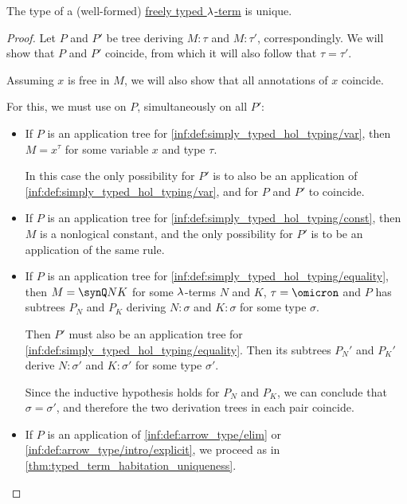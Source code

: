 \begin{proposition}\label{thm:simply_typed_hol_type_uniqueness}
  The type of a (well-formed) \hyperref[def:freely_typed_lambda_term]{freely typed \( {\mathrm \lambda} \)-term} is unique.
\end{proposition}
\begin{proof}
  Let \( P \) and \( P' \) be tree deriving \( M: \tau \) and \( M: \tau' \), correspondingly. We will show that \( P \) and \( P' \) coincide, from which it will also follow that \( \tau = \tau' \).

  Assuming \( x \) is free in \( M \), we will also show that all annotations of \( x \) coincide.

  For this, we must use  on \( P \), simultaneously on all \( P' \):
  \begin{itemize}
    \item If \( P \) is an application tree for \ref{inf:def:simply_typed_hol_typing/var}, then \( M = x^\tau \) for some variable \( x \) and type \( \tau \).

    In this case the only possibility for \( P' \) is to also be an application of \ref{inf:def:simply_typed_hol_typing/var}, and for \( P \) and \( P' \) to coincide.

    \item If \( P \) is an application tree for \ref{inf:def:simply_typed_hol_typing/const}, then \( M \) is a nonlogical constant, and the only possibility for \( P' \) is to be an application of the same rule.

    \item If \( P \) is an application tree for \ref{inf:def:simply_typed_hol_typing/equality}, then \( M = \synQ N K \) for some \( {\mathrm \lambda} \)-terms \( N \) and \( K \), \( \tau = \omicron \) and \( P \) has subtrees \( P_N \) and \( P_K \) deriving \( N: \sigma \) and \( K: \sigma \) for some type \( \sigma \).

    Then \( P' \) must also be an application tree for \ref{inf:def:simply_typed_hol_typing/equality}. Then its subtrees \( P_N' \) and \( P_K' \) derive \( N: \sigma' \) and \( K: \sigma' \) for some type \( \sigma' \).

    Since the inductive hypothesis holds for \( P_N \) and \( P_K \), we can conclude that \( \sigma = \sigma' \), and therefore the two derivation trees in each pair coincide.

    \item If \( P \) is an application of \ref{inf:def:arrow_type/elim} or \ref{inf:def:arrow_type/intro/explicit}, we proceed as in \cref{thm:typed_term_habitation_uniqueness}.
  \end{itemize}
\end{proof}

